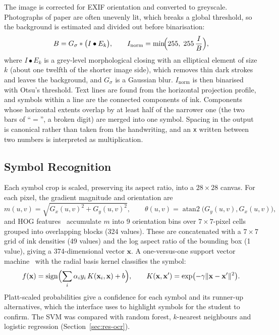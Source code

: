 \documentclass[runningheads]{llncs}
\begin{document}
The image is corrected for EXIF orientation and converted to greyscale. Photographs of paper are often unevenly lit, which breaks a global threshold, so the background is estimated and divided out before binarisation:
\begin{equation}
B=G_{\sigma}*\bigl(I\bullet E_k\bigr),\qquad I_{\text{norm}}=\min\!\Bigl(255,\;255\,\frac{I}{B}\Bigr),
\end{equation}
where $I\bullet E_k$ is a grey-level morphological closing with an elliptical element of size $k$ (about one twelfth of the shorter image side), which removes thin dark strokes and leaves the background, and $G_\sigma$ is a Gaussian blur. $I_{\text{norm}}$ is then binarised with Otsu's threshold. Text lines are found from the horizontal projection profile, and symbols within a line are the connected components of ink. Components whose horizontal extents overlap by at least half of the narrower one (the two bars of ``$=$'', a broken digit) are merged into one symbol. Spacing in the output is canonical rather than taken from the handwriting, and an \texttt{x} written between two numbers is interpreted as multiplication.

\subsection{Symbol Recognition}

Each symbol crop is scaled, preserving its aspect ratio, into a $28\times28$ canvas. For each pixel, the gradient magnitude and orientation are
\begin{equation}
m(u,v)=\sqrt{G_x(u,v)^2+G_y(u,v)^2},\qquad \theta(u,v)=\operatorname{atan2}\bigl(G_y(u,v),G_x(u,v)\bigr),
\end{equation}
and HOG features~\cite{dalal2005} accumulate $m$ into 9 orientation bins over $7\times7$-pixel cells grouped into overlapping blocks (324 values). These are concatenated with a $7\times7$ grid of ink densities (49 values) and the log aspect ratio of the bounding box (1 value), giving a 374-dimensional vector $\mathbf{x}$. A one-versus-one support vector machine~\cite{cortes1995} with the radial basis kernel classifies the symbol:
\begin{equation}
f(\mathbf{x})=\operatorname{sign}\Bigl(\sum_{i}\alpha_i y_i\,K(\mathbf{x}_i,\mathbf{x})+b\Bigr),\qquad K(\mathbf{x},\mathbf{x}')=\exp\bigl(-\gamma\lVert\mathbf{x}-\mathbf{x}'\rVert^2\bigr).
\end{equation}
Platt-scaled probabilities give a confidence for each symbol and its runner-up alternatives, which the interface uses to highlight symbols for the student to confirm. The SVM was compared with random forest, $k$-nearest neighbours and logistic regression (Section~\ref{sec:res-ocr}).
\end{document}
